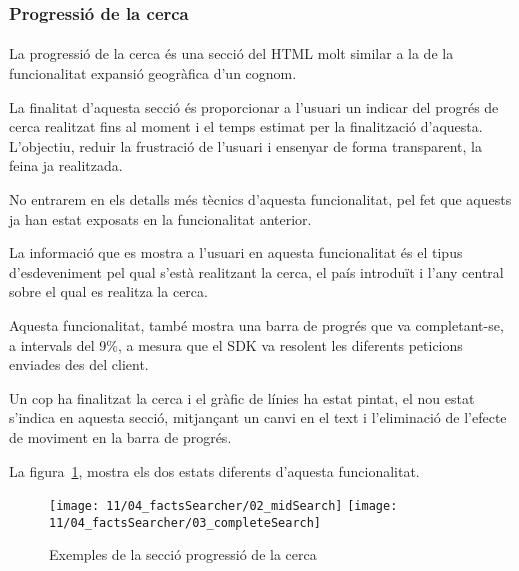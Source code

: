 \subsubsection{Progressió de la cerca}

\paragraph{}
La progressió de la cerca és una secció del HTML molt similar a la de la funcio\-nalitat expansió geogràfica d’un cognom.

La finalitat d'aquesta secció és proporcionar a l'usuari un indicar del progrés de cerca realitzat fins al moment i el temps estimat per la finalització d'aquesta. L'objectiu, reduir la frustració de l'usuari i ensenyar de forma transparent, la feina ja realitzada.

No entrarem en els detalls més tècnics d'aquesta funcionalitat, pel fet que aquests ja han estat exposats en la funcionalitat anterior.

La informació que es mostra a l'usuari en aquesta funcionalitat és el tipus d'es\-de\-ve\-ni\-ment pel qual s'està realitzant la cerca, el país introduït i l'any central sobre el qual es realitza la cerca.

Aquesta funcionalitat, també mostra una barra de progrés que va completant-se, a intervals del 9\%, a mesura que el SDK va resolent les diferents peticions enviades des del client.

Un cop ha finalitzat la cerca i el gràfic de línies ha estat pintat, el nou estat s'indica en aquesta secció, mitjançant un canvi en el text i l’eliminació de l'efecte de moviment en la barra de progrés.

La figura~\ref{fig:waitingFacts}, mostra els dos estats diferents d'aquesta funcionalitat.

\begin{figure}
    \texttt{[image: 11/04\_factsSearcher/02\_midSearch]}
    \texttt{[image: 11/04\_factsSearcher/03\_completeSearch]}
    \centering
    \caption{Exemples de la secció progressió de la cerca}\label{fig:waitingFacts}
\end{figure}
